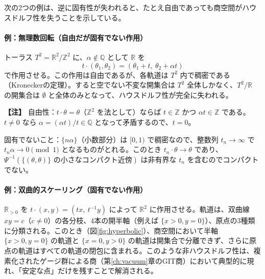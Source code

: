 \documentclass[uplatex, dvipdfmx, book]{jsbook}
\newenvironment{note}{\vspace{1ex}\par\footnotesize\noindent\textbf{【注】}}{\par\vspace{1ex}}
\begin{document}
次の2つの例は、逆に固有性が失われると、たとえ自由であっても商空間がハウスドルフ性を失うことを示している。

\paragraph{例：無理数回転（自由だが固有でない作用）}
トーラス $T^2 = \mathbb{R}^2/\mathbb{Z}^2$ に、$\alpha \notin \mathbb{Q}$ として $\mathbb{R}$ を
\begin{equation}
    t \cdot (\theta_1, \theta_2) = (\theta_1 + t,\ \theta_2 + \alpha t)
\end{equation}
で作用させる。この作用は自由であるが、各軌道は $T^2$ 内で稠密である（Kroneckerの定理）。すると空でない不変な開集合は $T^2$ 全体しかなく、$T^2/\mathbb{R}$ の開集合は $\emptyset$ と全体のみとなって、ハウスドルフ性が完全に失われる。

\begin{note}
自由性：$t \cdot \theta = \theta$（$\mathbb{Z}^2$ を法として）ならば $t \in \mathbb{Z}$ かつ $\alpha t \in \mathbb{Z}$ である。$t \neq 0$ なら $\alpha = (\alpha t)/t \in \mathbb{Q}$ となって矛盾するので、$t = 0$。

固有でないこと：$\{n\alpha\}$（小数部分）は $[0,1)$ で稠密なので、整数列 $t_n \to \infty$ で $t_n \alpha \to 0 \pmod 1$ となるものがとれる。このとき $t_n \cdot \theta \to \theta$ であり、$\Psi^{-1}(\{(\theta, \theta)\} \text{ の小さなコンパクト近傍})$ は非有界な $t_n$ を含むのでコンパクトでない。
\end{note}

\paragraph{例：双曲的スケーリング（固有でない作用）}
$\mathbb{R}_{>0}$ を $t \cdot (x, y) = (t x,\ t^{-1} y)$ によって $\mathbb{R}^2$ に作用させる。軌道は、双曲線 $xy = c$（$c \neq 0$）の各分枝、4本の開半軸（例えば $\{x > 0, y = 0\}$）、原点の3種類に分類される。このとき（図\ref{fig:hyperbolic}）、商空間において半軸 $\{x > 0, y = 0\}$ の軌道と $\{x = 0, y > 0\}$ の軌道は開集合で分離できず、さらに原点の軌道はすべての軌道の閉包に含まれる。このような非ハウスドルフ性は、複素化されたゲージ群による商（第\ref{ch:vacuum}章のGIT商）において典型的に現れ、「安定な点」だけを残すことで解消される。
\end{document}
